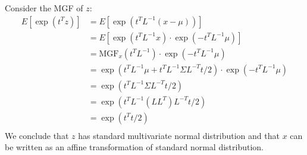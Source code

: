 \documentclass{article}
\begin{document}
Consider the MGF of \(z\):
\begin{align*}
E[\exp(t^Tz)] &= E[\exp(t^TL^{-1}(x-\mu))]\\
&= E[\exp(t^TL^{-1}x) \cdot \exp(-t^TL^{-1}\mu)]\\
&= \mathrm{MGF}_x(t^TL^{-1}) \cdot \exp(-t^TL^{-1}\mu)\\
&= \exp(t^TL^{-1}\mu + t^TL^{-1}\Sigma L^{-T}t/2) \cdot \exp(-t^TL^{-1}\mu)\\
&= \exp(t^TL^{-1}\Sigma L^{-T}t/2)\\
&= \exp(t^TL^{-1} (LL^T) L^{-T}t/2)\\
&= \exp(t^Tt/2)\\
\end{align*}
We conclude that \(z\) has standard multivariate normal distribution and that \(x\) can be written as an affine transformation of standard normal distribution.
\end{document}
